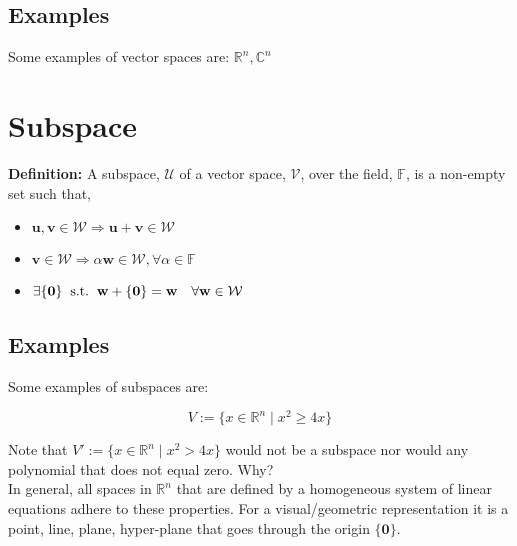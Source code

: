 \documentclass[a4paper]{article}
\begin{document}
\subsection{Examples}
Some examples of vector spaces are: $\mathbb{R}^{n}, \mathbb{C}^{n}$

\section{Subspace}
\textbf{Definition:} A subspace, $\mathcal{U}$ of a vector space, $\mathcal{V}$, over the field, $\mathbb{F}$, is a non-empty set such that,

\begin{itemize}
\item $\mathbf{u,v}\in\mathcal{W}\Rightarrow\mathbf{u+v}\in\mathcal{W}$
\item $\mathbf{v}\in\mathcal{W}\Rightarrow\alpha\mathbf{w}\in\mathcal{W},\forall\alpha\in\mathbb{F}$
\item $\exists \{\mathbf{0}\} \hspace{2mm} \textnormal{s.t.} \hspace{2mm} \mathbf{w} +\{\mathbf{0}\} = \mathbf{w} \quad \forall\mathbf{w}\in\mathcal{W}$
\end{itemize}

\subsection{Examples}
Some examples of subspaces are:

$$
V := \{x\in\mathbb{R}^{n}\mid x^{2} \geq 4x\}
$$

Note that $V' := \{x\in\mathbb{R}^{n}\mid x^{2} > 4x\}$ would not be a subspace nor would any polynomial that does not equal zero. Why?\\
In general, all spaces in $\mathbb{R}^{n}$ that are defined by a homogeneous system of linear equations adhere to these properties. For a visual/geometric representation it is a point, line, plane, hyper-plane that goes through the origin $\{\mathbf{0}\}$.

\end{document}
